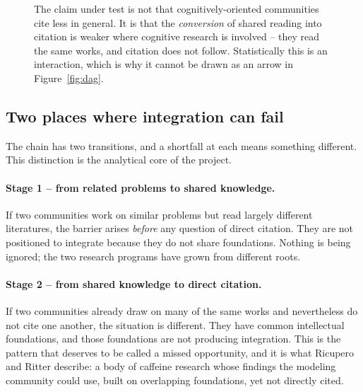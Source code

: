 \documentclass[11pt]{article}
\begin{document}
\begin{figure}[H]
\centering
{}
\caption{The claim under test is not that cognitively-oriented communities cite less in
general. It is that the \emph{conversion} of shared reading into citation is weaker where
cognitive research is involved -- they read the same works, and citation does not follow.
Statistically this is an interaction, which is why it cannot be drawn as an arrow in
Figure~\ref{fig:dag}.}
\label{fig:moderation}
\end{figure}



\subsection{Two places where integration can fail}
\label{sec:twoplaces}

The chain has two transitions, and a shortfall at each means something different. This
distinction is the analytical core of the project.

\paragraph{Stage 1 -- from related problems to shared knowledge.}
If two communities work on similar problems but read largely different literatures, the
barrier arises \emph{before} any question of direct citation. They are not positioned to
integrate because they do not share foundations. Nothing is being ignored; the two
research programs have grown from different roots.

\paragraph{Stage 2 -- from shared knowledge to direct citation.}
If two communities already draw on many of the same works and nevertheless do not cite one
another, the situation is different. They have common intellectual foundations, and those
foundations are not producing integration. This is the pattern that deserves to be called
a missed opportunity, and it is what Ricupero and Ritter describe: a body of caffeine
research whose findings the modeling community could use, built on overlapping
foundations, yet not directly cited.
\end{document}

